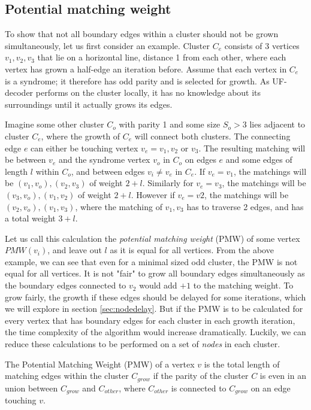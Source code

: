 \subsection{Potential matching weight}

To show that not all boundary edges within a cluster should not be grown simultaneously, let us first consider an example. Cluster $C_e$ consists of 3 vertices $v_1, v_2, v_3$ that lie on a horizontal line, distance 1 from each other, where each vertex has grown a half-edge an iteration before. Assume that each vertex in $C_e$ is a syndrome; it therefore has odd parity and is selected for growth. As UF-decoder performs on the cluster locally, it has no knowledge about its surroundings until it actually grows its edges.

Imagine some other cluster $C_o$ with parity 1 and some size $S_o > 3$ lies adjacent to cluster $C_e$, where the growth of $C_e$ will connect both clusters. The connecting edge $e$ can either be touching vertex $v_e = v_1, v_2$ or $v_3$. The resulting matching will be between $v_e$ and the syndrome vertex $v_o$ in $C_o$ on edges $e$ and some edges of length $l$ within $C_o$, and between edges $v_i \neq v_e$ in $C_e$. If $v_e = v_1$, the matchings will be $(v_1, v_o), (v_2, v_3)$ of weight $2 + l$. Similarly for $v_e = v_3$, the matchings will be $(v_3, v_o), (v_1, v_2)$ of weight $2 + l$. However if $v_e = v2$, the matchings will be $(v_2, v_o), (v_1, v_3)$, where the matching of $v_1, v_3$ has to traverse 2 edges, and has a total weight $3 + l$.

Let us call this calculation the \emph{potential matching weight} (PMW) of some vertex $PMW(v_i)$, and leave out $l$ as it is equal for all vertices. From the above example, we can see that even for a minimal sized odd cluster, the PMW is not equal for all vertices. It is not "fair" to grow all boundary edges simultaneously as the boundary edges connected to $v_2$ would add $+1$ to the matching weight. To grow fairly, the growth if these edges should be delayed for some iterations, which we will explore in section \ref{sec:nodedelay}. But if the PMW is to be calculated for every vertex that has boundary edges for each cluster in each growth iteration, the time complexity of the algorithm would increase dramatically. Luckily, we can reduce these calculations to be performed on a set of \emph{nodes} in each cluster.

\begin{lemma}
  The Potential Matching Weight (PMW) of a vertex $v$ is the total length of matching edges within the cluster $C_{grow}$ if the parity of the cluster $C$ is even in an union between $C_{grow}$ and $C_{other}$, where $C_{other}$ is connected to $C_{grow}$ on an edge touching $v$.
\end{lemma}

